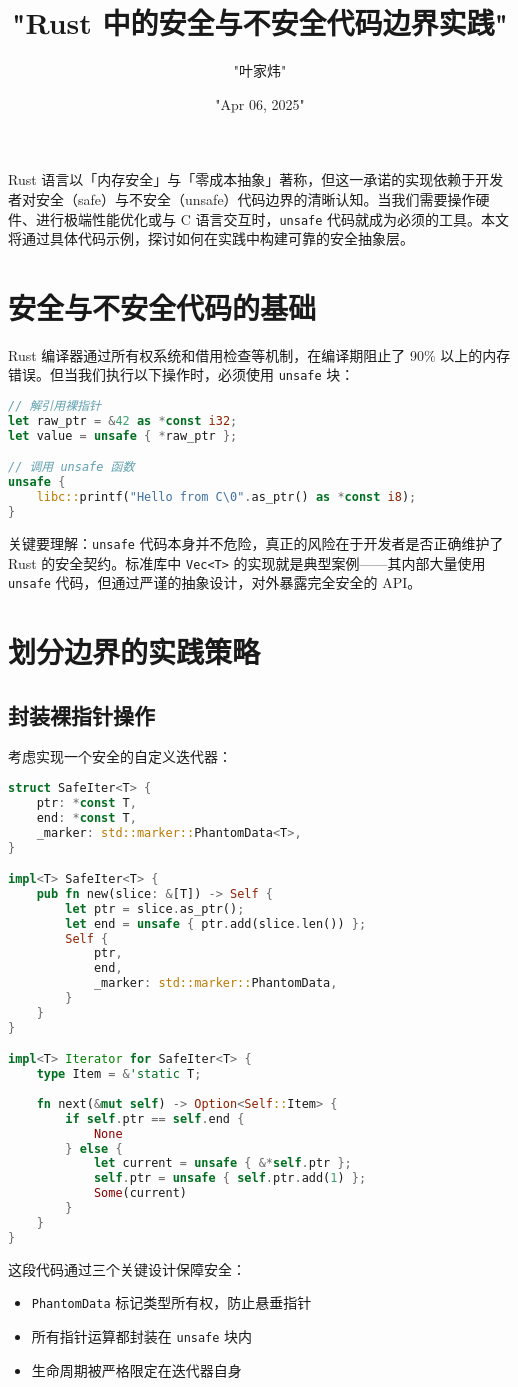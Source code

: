 \title{"Rust 中的安全与不安全代码边界实践"}
\author{"叶家炜"}
\date{"Apr 06, 2025"}
\maketitle
Rust 语言以「内存安全」与「零成本抽象」著称，但这一承诺的实现依赖于开发者对安全（safe）与不安全（unsafe）代码边界的清晰认知。当我们需要操作硬件、进行极端性能优化或与 C 语言交互时，\verb!unsafe! 代码就成为必须的工具。本文将通过具体代码示例，探讨如何在实践中构建可靠的安全抽象层。\par
\chapter{安全与不安全代码的基础}
Rust 编译器通过所有权系统和借用检查等机制，在编译期阻止了 90\%{} 以上的内存错误。但当我们执行以下操作时，必须使用 \verb!unsafe! 块：\par
\begin{lstlisting}[language=rust]
// 解引用裸指针
let raw_ptr = &42 as *const i32;
let value = unsafe { *raw_ptr };

// 调用 unsafe 函数
unsafe {
    libc::printf("Hello from C\0".as_ptr() as *const i8);
}
\end{lstlisting}
关键要理解：\verb!unsafe! 代码本身并不危险，真正的风险在于开发者是否正确维护了 Rust 的安全契约。标准库中 \verb!Vec<T>! 的实现就是典型案例——其内部大量使用 \verb!unsafe! 代码，但通过严谨的抽象设计，对外暴露完全安全的 API。\par
\chapter{划分边界的实践策略}
\section{封装裸指针操作}
考虑实现一个安全的自定义迭代器：\par
\begin{lstlisting}[language=rust]
struct SafeIter<T> {
    ptr: *const T,
    end: *const T,
    _marker: std::marker::PhantomData<T>,
}

impl<T> SafeIter<T> {
    pub fn new(slice: &[T]) -> Self {
        let ptr = slice.as_ptr();
        let end = unsafe { ptr.add(slice.len()) };
        Self {
            ptr,
            end,
            _marker: std::marker::PhantomData,
        }
    }
}

impl<T> Iterator for SafeIter<T> {
    type Item = &'static T;
    
    fn next(&mut self) -> Option<Self::Item> {
        if self.ptr == self.end {
            None
        } else {
            let current = unsafe { &*self.ptr };
            self.ptr = unsafe { self.ptr.add(1) };
            Some(current)
        }
    }
}
\end{lstlisting}
这段代码通过三个关键设计保障安全：\par
\begin{itemize}
\item \verb!PhantomData! 标记类型所有权，防止悬垂指针
\item 所有指针运算都封装在 \verb!unsafe! 块内
\item 生命周期被严格限定在迭代器自身
\end{itemize}
